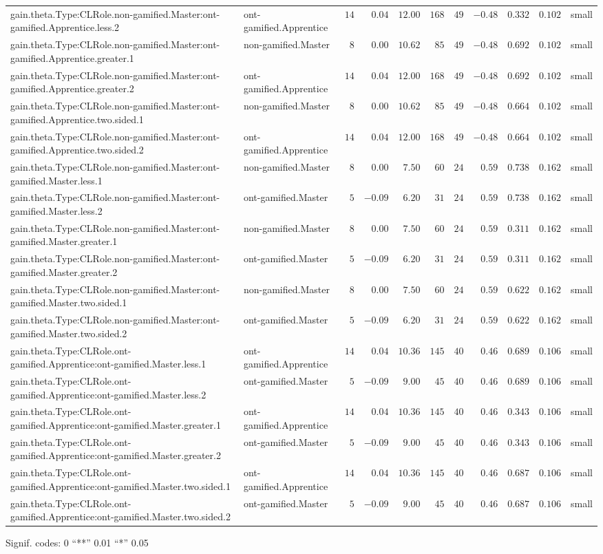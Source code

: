 \documentclass[6pt]{article}
\begin{document}
\begin{landscape}
{\begin{longtable}{llrrrrrrrrl}
gain.theta.Type:CLRole.non-gamified.Master:ont-gamified.Apprentice.less.2&ont-gamified.Apprentice&$14$&$ 0.04$&$12.00$&$168$&$ 49$&$-0.48$&$0.332$&$0.102$&small\tabularnewline
gain.theta.Type:CLRole.non-gamified.Master:ont-gamified.Apprentice.greater.1&non-gamified.Master&$ 8$&$ 0.00$&$10.62$&$ 85$&$ 49$&$-0.48$&$0.692$&$0.102$&small\tabularnewline
gain.theta.Type:CLRole.non-gamified.Master:ont-gamified.Apprentice.greater.2&ont-gamified.Apprentice&$14$&$ 0.04$&$12.00$&$168$&$ 49$&$-0.48$&$0.692$&$0.102$&small\tabularnewline
gain.theta.Type:CLRole.non-gamified.Master:ont-gamified.Apprentice.two.sided.1&non-gamified.Master&$ 8$&$ 0.00$&$10.62$&$ 85$&$ 49$&$-0.48$&$0.664$&$0.102$&small\tabularnewline
gain.theta.Type:CLRole.non-gamified.Master:ont-gamified.Apprentice.two.sided.2&ont-gamified.Apprentice&$14$&$ 0.04$&$12.00$&$168$&$ 49$&$-0.48$&$0.664$&$0.102$&small\tabularnewline
gain.theta.Type:CLRole.non-gamified.Master:ont-gamified.Master.less.1&non-gamified.Master&$ 8$&$ 0.00$&$ 7.50$&$ 60$&$ 24$&$ 0.59$&$0.738$&$0.162$&small\tabularnewline
gain.theta.Type:CLRole.non-gamified.Master:ont-gamified.Master.less.2&ont-gamified.Master&$ 5$&$-0.09$&$ 6.20$&$ 31$&$ 24$&$ 0.59$&$0.738$&$0.162$&small\tabularnewline
gain.theta.Type:CLRole.non-gamified.Master:ont-gamified.Master.greater.1&non-gamified.Master&$ 8$&$ 0.00$&$ 7.50$&$ 60$&$ 24$&$ 0.59$&$0.311$&$0.162$&small\tabularnewline
gain.theta.Type:CLRole.non-gamified.Master:ont-gamified.Master.greater.2&ont-gamified.Master&$ 5$&$-0.09$&$ 6.20$&$ 31$&$ 24$&$ 0.59$&$0.311$&$0.162$&small\tabularnewline
gain.theta.Type:CLRole.non-gamified.Master:ont-gamified.Master.two.sided.1&non-gamified.Master&$ 8$&$ 0.00$&$ 7.50$&$ 60$&$ 24$&$ 0.59$&$0.622$&$0.162$&small\tabularnewline
gain.theta.Type:CLRole.non-gamified.Master:ont-gamified.Master.two.sided.2&ont-gamified.Master&$ 5$&$-0.09$&$ 6.20$&$ 31$&$ 24$&$ 0.59$&$0.622$&$0.162$&small\tabularnewline
gain.theta.Type:CLRole.ont-gamified.Apprentice:ont-gamified.Master.less.1&ont-gamified.Apprentice&$14$&$ 0.04$&$10.36$&$145$&$ 40$&$ 0.46$&$0.689$&$0.106$&small\tabularnewline
gain.theta.Type:CLRole.ont-gamified.Apprentice:ont-gamified.Master.less.2&ont-gamified.Master&$ 5$&$-0.09$&$ 9.00$&$ 45$&$ 40$&$ 0.46$&$0.689$&$0.106$&small\tabularnewline
gain.theta.Type:CLRole.ont-gamified.Apprentice:ont-gamified.Master.greater.1&ont-gamified.Apprentice&$14$&$ 0.04$&$10.36$&$145$&$ 40$&$ 0.46$&$0.343$&$0.106$&small\tabularnewline
gain.theta.Type:CLRole.ont-gamified.Apprentice:ont-gamified.Master.greater.2&ont-gamified.Master&$ 5$&$-0.09$&$ 9.00$&$ 45$&$ 40$&$ 0.46$&$0.343$&$0.106$&small\tabularnewline
\newpage
gain.theta.Type:CLRole.ont-gamified.Apprentice:ont-gamified.Master.two.sided.1&ont-gamified.Apprentice&$14$&$ 0.04$&$10.36$&$145$&$ 40$&$ 0.46$&$0.687$&$0.106$&small\tabularnewline
gain.theta.Type:CLRole.ont-gamified.Apprentice:ont-gamified.Master.two.sided.2&ont-gamified.Master&$ 5$&$-0.09$&$ 9.00$&$ 45$&$ 40$&$ 0.46$&$0.687$&$0.106$&small\tabularnewline
\hline
\end{longtable}}\end{landscape}
\begin{flushright}{ \tiny{ Signif. codes:  0 ``**'' 0.01 ``*'' 0.05 }}\end{flushright} 
\end{document}
